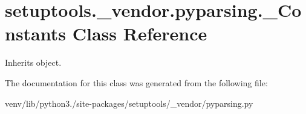 \hypertarget{classsetuptools_1_1__vendor_1_1pyparsing_1_1___constants}{}\section{setuptools.\+\_\+vendor.\+pyparsing.\+\_\+\+Constants Class Reference}
\label{classsetuptools_1_1__vendor_1_1pyparsing_1_1___constants}


Inherits object.



The documentation for this class was generated from the following file\+:\begin{DoxyCompactItemize}
\item 
venv/lib/python3./site-\/packages/setuptools/\+\_\+vendor/pyparsing.\+py\end{DoxyCompactItemize}

